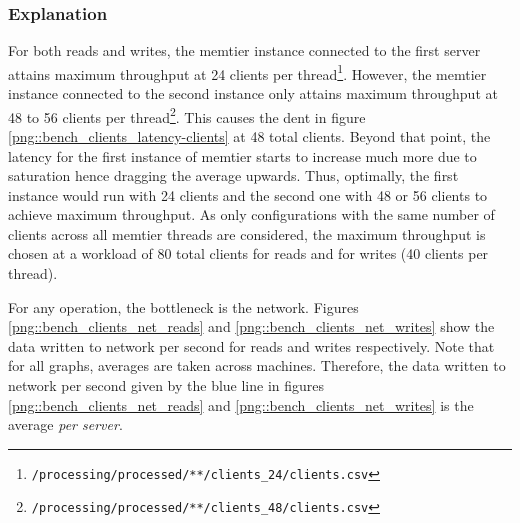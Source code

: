 \documentclass[11pt,a4paper]{article}
\begin{document}
\subsubsection{Explanation}
For both reads and writes, the memtier instance connected to the first server attains maximum throughput at 24 clients per thread\footnote{\texttt{/processing/processed/**/clients_24/clients.csv}}. However, the memtier instance connected to the second instance only attains maximum throughput at 48 to 56 clients per thread\footnote{\texttt{/processing/processed/**/clients_48/clients.csv}}. This causes the dent in figure \ref{png::bench_clients_latency-clients} at 48 total clients. Beyond that point, the latency for the first instance of memtier starts to increase much more due to saturation hence dragging the average upwards. Thus, optimally, the first instance would run with 24 clients and the second one with 48 or 56 clients to achieve maximum throughput. As only configurations with the same number of clients across all memtier threads are considered, the maximum throughput is chosen at a workload of 80 total clients for reads and for writes (40 clients per thread).

For any operation, the bottleneck is the network. Figures \ref{png::bench_clients_net_reads} and \ref{png::bench_clients_net_writes} show the data written to network per second for reads and writes respectively. Note that for all graphs, averages are taken across machines. Therefore, the data written to network per second given by the blue line in figures \ref{png::bench_clients_net_reads} and \ref{png::bench_clients_net_writes} is the average \textit{per server}.
\end{document}
